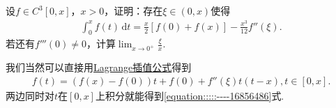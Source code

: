 \documentclass[../../main.tex]{subfiles}%
\begin{document}
\begin{example}
设$f \in C^3[0,x]$，$x > 0$，证明：存在$\xi \in (0,x)$使得
\begin{align}\label{equation:::::----16856486}
\int_0^x f(t) \,\mathrm{d}t = \frac{x}{2}[f(0) + f(x)] - \frac{x^3}{12}f''(\xi).
\end{align}
若还有$f'''(0) \neq 0$，计算$\lim_{x \to 0^+} \frac{\xi}{x}.$
\end{example}
\begin{note}
我们当然可以直接用\hyperref[proposition:Lagrange插值公式]{Lagrange插值公式}得到
\begin{align*}
f\left( t \right) =\left( f\left( x \right) -f\left( 0 \right) \right) t+f\left( 0 \right) +f'' \left( \xi \right) t\left( t-x \right) ,t\in \left[ 0,x \right] .
\end{align*}
两边同时对$t$在$[0,x]$上积分就能得到\eqref{equation:::::----16856486}式.
\end{note}
\end{document}
